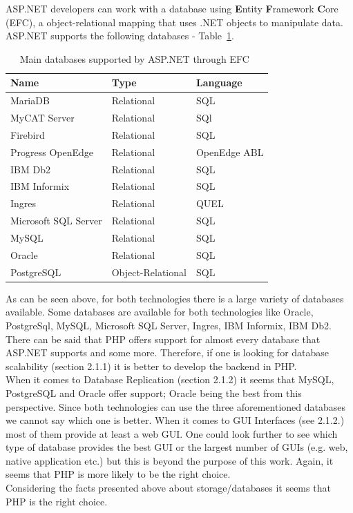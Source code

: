 \documentclass[11]{article}
\begin{document}
		ASP.NET developers can work with a database using \textbf{E}ntity \textbf{F}ramework \textbf{C}ore (EFC), a object-relational mapping that uses .NET objects to manipulate data. ASP.NET supports the following databases - Table~\ref{aspDbSupp}.

		\begin{table}[H]
			\caption{Main databases supported by ASP.NET through EFC~\citep{AspDbs}}
			\label{aspDbSupp}
			  \centering
				\begin{tabular}{|l|l|l|}
					\hline
					\textbf{Name} & \textbf{Type} & \textbf{Language}\\
					\hline
					MariaDB & Relational & SQL\\
					\hline
					MyCAT Server& Relational & SQl\\
					\hline
					Firebird & Relational & SQL\\
					\hline 
					Progress OpenEdge & Relational & OpenEdge ABL\\
					\hline 
					IBM Db2 & Relational & SQL\\
					\hline 
					IBM Informix & Relational & SQL\\
					\hline 
					Ingres & Relational & QUEL\\
					\hline 
					Microsoft SQL Server & Relational & SQL\\
					\hline 
					MySQL& Relational & SQL\\
					\hline 
					Oracle  & Relational & SQL\\
					\hline 
					PostgreSQL  & Object-Relational & SQL\\
					\hline 
				\end{tabular}

		\end{table}


	As can be seen above, for both technologies there is a large variety of databases available. Some databases are available for both technologies like Oracle, PostgreSql, MySQL, Microsoft SQL Server, Ingres, IBM Informix, IBM Db2. There can be said that PHP offers support for almost every database that ASP.NET supports and some more. Therefore, if one is looking for database scalability (section 2.1.1) it is better to develop the backend in PHP.\\
	\indent
	When it comes to Database Replication (section 2.1.2) it seems that MySQL, PostgreSQL and Oracle offer support; Oracle being the best from this perspective. Since both technologies can use the three aforementioned databases we cannot say which one is better. 
	\indent
	When it comes to GUI Interfaces (see 2.1.2.) most of them provide at least a web GUI. One could look further to see which type of database provides the best GUI or the largest number of GUIs (e.g. web, native application etc.) but this is beyond the purpose of this work. Again, it seems that PHP is more likely to be the right choice.\\
	\indent
	Considering the facts presented above about storage/databases it seems that PHP is the right choice.
\end{document}
